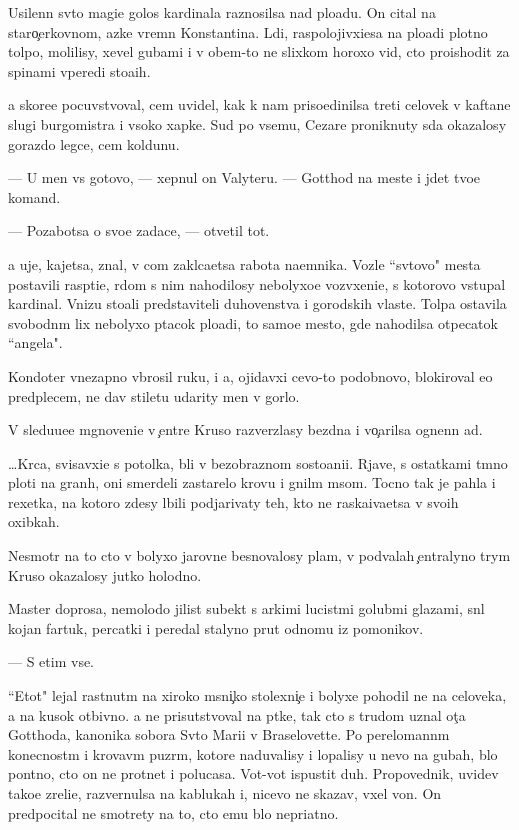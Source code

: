 \documentclass[10pt]{book}
\begin{document}
Usilenn{\yi}{\y} sv{\ia}to{\y} magi{\y}e{\y} golos kardinala raznosilsa nad plo{\x}ad{\y}u. On cital na staro{\c}erkovnom, {\y}az{\yi}ke vrem{\e}n Konstantina. L{\iu}di, raspolojivxi{\y}esa na plo{\x}adi plotno{\y} tolpo{\y}, molilisy, xevel{\ia} gubami i v ob{\x}em-to ne slixkom horoxo vid{\ia}, cto proishodit za spinami vperedi sto{\y}a{\x}ih.

{\Y}a skore{\y}e pocuvstvoval, cem uvidel, kak k nam priso{\y}edinilsa treti{\y} celovek v kaftane slugi burgomistra i v{\yi}soko{\y} xapke. Sud{\ia} po vsemu, Cezare proniknuty s{\iu}da okazalosy gorazdo legce, cem koldunu.

— U men{\ia} vs{\e} gotovo, — xepnul on Valyteru. — Gotthod na meste i jdet tvo{\y}e{\y} komand{\yi}.

— Pozabotsa o svo{\y}e{\y} zadace, — otvetil tot.

{\Y}a uje, kajetsa, znal, v com zakl{\iu}ca{\y}etsa rabota na{\y}emnika. Vozle ``sv{\ia}tovo" mesta postavili rasp{\ia}ti{\y}e, r{\ia}dom s nim nahodilosy nebolyxo{\y}e vozv{\yi}xeni{\y}e, s kotorovo v{\yi}stupal kardinal. Vnizu sto{\y}ali predstaviteli duhovenstva i gorodskih vlaste{\y}. Tolpa ostavila svobodn{\yi}m lix nebolyxo{\y} p{\ia}tacok plo{\x}adi, to samo{\y}e mesto, gde nahodilsa otpecatok ``angela".

Kondot{\y}er vnezapno v{\yi}brosil ruku, i {\y}a, ojidavxi{\y} cevo-to podobnovo, blokiroval {\y}e{\y}o predplec{\y}em, ne dav stiletu udarity men{\ia} v gorlo.

V sledu{\y}u{\x}e{\y}e mgnoveni{\y}e v {\c}entre Kruso razverzlasy bezdna i vo{\c}arilsa ognenn{\yi}{\y} ad.



…Kr{\iu}c{\y}a, svisavxi{\y}e s potolka, b{\yi}li v bezobraznom sosto{\y}ani{\y}i. Rjav{\yi}{\y}e, s ostatkami t{\e}mno{\y} ploti na gran{\ia}h, oni smerdeli zastarelo{\y} krov{\y}u i gnil{\yi}m m{\ia}som. Tocno tak je pahla i rexetka, na kotoro{\y} zdesy l{\iu}bili podjarivaty teh, kto ne raska{\y}iva{\y}etsa v svo{\y}ih oxibkah.

Nesmotr{\ia} na to cto v bolyxo{\y} jarovne besnovalosy plam{\ia}, v podvalah {\c}entralyno{\y} t{\iu}rym{\yi} Kruso okazalosy jutko holodno.

Master doprosa, nemolodo{\y} jilist{\yi}{\y} sub{\y}ekt s {\y}arkimi lucist{\yi}mi golub{\yi}mi glazami, sn{\ia}l kojan{\yi}{\y} fartuk, percatki i peredal stalyno{\y} prut odnomu iz pomo{\x}nikov.

— S etim vse.

``Etot" lejal rast{\ia}nut{\yi}m na xiroko{\y} m{\ia}sni{\c}ko{\y} stolexni{\c}e i bolyxe pohodil ne na celoveka, a na kusok otbivno{\y}. {\Y}a ne prisutstvoval na p{\yi}tke, tak cto s trudom uznal ot{\c}a Gotthoda, kanonika sobora Sv{\ia}to{\y} Mari{\y}i v Braselovette. Po perelomann{\yi}m konecnost{\ia}m i krovav{\yi}m puz{\yi}r{\ia}m, kotor{\yi}{\y}e naduvalisy i lopalisy u nevo na gubah, b{\yi}lo pon{\ia}tno, cto on ne prot{\ia}net i polucasa. Vot-vot ispustit duh. Propovednik, uvidev tako{\y}e zreli{\x}e, razvernulsa na kablukah i, nicevo ne skazav, v{\yi}xel von. On predpocital ne smotrety na to, cto {\y}emu b{\yi}lo nepri{\y}atno.
\end{document}
